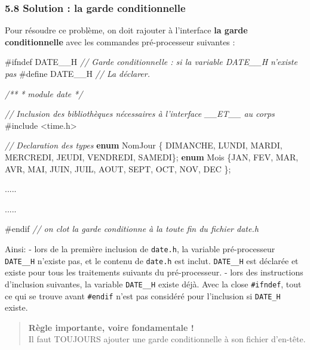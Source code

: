 \documentclass[11pt]{article}
\newenvironment{Shaded}{}{}
\newcommand{\KeywordTok}[1]{\textcolor[rgb]{0.00,0.44,0.13}{\textbf{{#1}}}}
\newcommand{\CommentTok}[1]{\textcolor[rgb]{0.38,0.63,0.69}{\textit{{#1}}}}
\newcommand{\NormalTok}[1]{{#1}}
\newcommand{\ImportTok}[1]{{#1}}
\newcommand{\PreprocessorTok}[1]{\textcolor[rgb]{0.74,0.48,0.00}{{#1}}}
\begin{document}
    \subsubsection{5.8 Solution : la garde
conditionnelle}\label{solution-la-garde-conditionnelle}

Pour résoudre ce problème, on doit rajouter à l'interface \textbf{la
garde conditionnelle} avec les commandes pré-processeur suivantes :

\begin{Shaded}
\begin{Highlighting}[]
    \PreprocessorTok{#ifndef DATE__H  }\CommentTok{// Garde conditionnelle : si la variable DATE__H n'existe pas }
    \PreprocessorTok{#define DATE__H  }\CommentTok{// La déclarer.}
    
    \CommentTok{/**}
\CommentTok{     *  module date}
\CommentTok{     */}

    \CommentTok{// Inclusion des bibliothèques nécessaires à l'interface __ET__ au corps}
    \PreprocessorTok{#include }\ImportTok{<time.h>}

    \CommentTok{// Declaration des types }
    \KeywordTok{enum}\NormalTok{ NomJour \{ DIMANCHE, LUNDI, MARDI, MERCREDI, JEUDI, VENDREDI, SAMEDI\};}
    \KeywordTok{enum}\NormalTok{ Mois \{JAN, FEV, MAR, AVR, MAI, JUIN, JUIL, AOUT, SEPT, OCT, NOV, DEC \};}
    
\NormalTok{    ..... }
    
\NormalTok{    .....}
    
    \PreprocessorTok{#endif }\CommentTok{// on clot la garde conditionne à la toute fin du fichier date.h}
\end{Highlighting}
\end{Shaded}

Ainsi: - lors de la première inclusion de \texttt{date.h}, la variable
pré-processeur \texttt{DATE\_\_H} n'existe pas, et le contenu de
\texttt{date.h} est inclut. \texttt{DATE\_\_H} est déclarée et existe
pour tous les traitements suivants du pré-processeur. - lors des
instructions d'inclusion suivantes, la variable \texttt{DATE\_\_H}
existe déjà. Avec la close \texttt{\#ifndef}, tout ce qui se trouve
avant \texttt{\#endif} n'est pas considéré pour l'inclusion si
\texttt{DATE\_H} existe.

\begin{quote}
\textbf{Règle importante, voire fondamentale !}\\
Il faut TOUJOURS ajouter une garde conditionnelle à son fichier
d'en-tête.
\end{quote}
\end{document}
